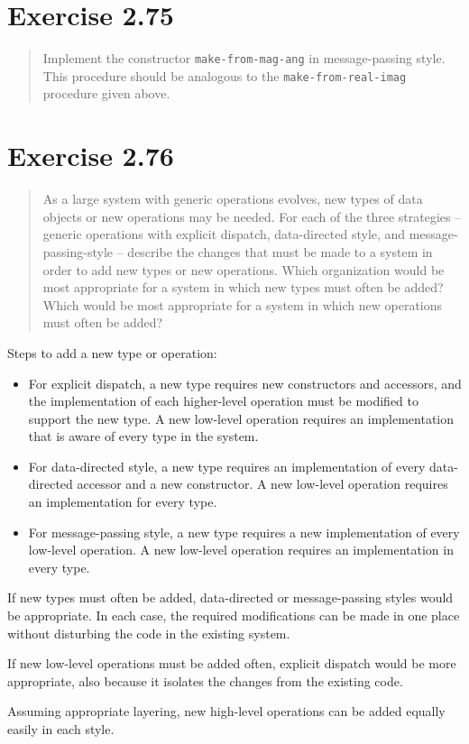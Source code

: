 \documentclass{article}
\begin{document}
\section{Exercise 2.75}
\begin{quote}
    Implement the constructor \texttt{make-from-mag-ang} in message-passing
    style. This procedure should be analogous to the
    \texttt{make-from-real-imag} procedure given above.
\end{quote}



\section{Exercise 2.76}
\begin{quote}
    As a large system with generic operations evolves, new types of data
    objects or new operations may be needed. For each of the three strategies
    -- generic operations with explicit dispatch, data-directed style, and
    message-passing-style -- describe the changes that must be made to a system
    in order to add new types or new operations. Which organization would be
    most appropriate for a system in which new types must often be added? Which
    would be most appropriate for a system in which new operations must often
    be added?
\end{quote}

Steps to add a new type or operation:
\begin{itemize}
    \item For explicit dispatch, a new type requires new constructors and
        accessors, and the implementation of each higher-level operation must
        be modified to support the new type. A new low-level operation requires
        an implementation that is aware of every type in the system.
    \item For data-directed style, a new type requires an implementation of
        every data-directed accessor and a new constructor. A new low-level
        operation requires an implementation for every type.
    \item For message-passing style, a new type requires a new implementation of
        every low-level operation. A new low-level operation requires an
        implementation in every type.
\end{itemize}

If new types must often be added, data-directed or message-passing styles would
be appropriate. In each case, the required modifications can be made in one
place without disturbing the code in the existing system.

If new low-level operations must be added often, explicit dispatch would be more
appropriate, also because it isolates the changes from the existing code.

Assuming appropriate layering, new high-level operations can be added equally
easily in each style.
\end{document}
